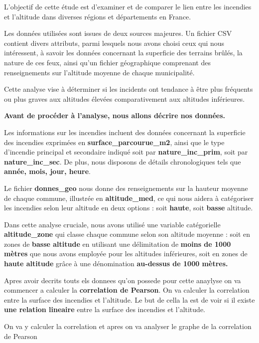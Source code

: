 \documentclass[
]{article}
\begin{document}
L'objectif de cette étude est d'examiner et de comparer le lien entre
les incendies et l'altitude dans diverses régions et départements en
France.

Les données utilisées sont issues de deux sources majeures. Un fichier
CSV contient divers attributs, parmi lesquels nous avons choisi ceux qui
nous intéressent, à savoir les données concernant la superficie des
terrains brûlés, la nature de ces feux, ainsi qu'un fichier géographique
comprenant des renseignements sur l'altitude moyenne de chaque
municipalité.

Cette analyse vise à déterminer si les incidents ont tendance à être
plus fréquents ou plus graves aux altitudes élevées comparativement aux
altitudes inférieures.

\textbf{Avant de procéder à l'analyse, nous allons décrire nos données.}

Les informations sur les incendies incluent des données concernant la
superficie des incendies exprimées en \textbf{surface\_parcourue\_m2},
ainsi que le type d'incendie principal et secondaire indiqué soit par
\textbf{nature\_inc\_prim}, soit par \textbf{nature\_inc\_sec}. De plus,
nous disposons de détails chronologiques tels que \textbf{année, mois,
jour, heure}.

Le fichier \textbf{donnes\_geo} nous donne des renseignements sur la
hauteur moyenne de chaque commune, illustrée en \textbf{altitude\_med},
ce qui nous aidera à catégoriser les incendies selon leur altitude en
deux options : soit \textbf{haute}, soit \textbf{basse} altitude.

Dans cette analyse cruciale, nous avons utilisé une variable
catégorielle \textbf{altitude\_zone} qui classe chaque commune selon son
altitude moyenne : soit en zones de \textbf{basse altitude} en utilisant
une délimitation de \textbf{moins de 1000 mètres} que nous avons
employée pour les altitudes inférieures, soit en zones de \textbf{haute
altitude} grâce à une dénomination \textbf{au-dessus de 1000 mètres.}

Apres avoir decrits touts els donnees qu'on possede pour cette anaylyse
on va commencer a calculer la \textbf{correlation de Pearson}. On va
calculer la correlation entre la surface des incendies et l'altitude. Le
but de cella la est de voir si il existe \textbf{une relation lineaire}
entre la surface des incendies et l'altitude.

On va y calculer la correlation et apres on va analyser le graphe de la
correlation de Pearson
\end{document}
